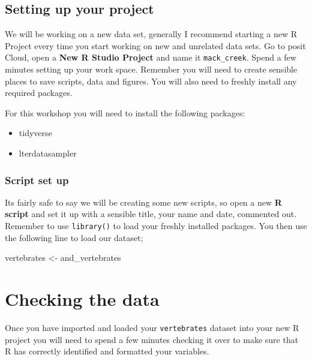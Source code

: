 \documentclass[
]{book}
\newenvironment{Shaded}{\begin{snugshade}}{\end{snugshade}}
\newcommand{\NormalTok}[1]{#1}
\newcommand{\OtherTok}[1]{\textcolor[rgb]{0.56,0.35,0.01}{#1}}
\providecommand{\tightlist}{%
  \setlength{\itemsep}{0pt}\setlength{\parskip}{0pt}}
\begin{document}
\hypertarget{setting-up-your-project}{%
\section{Setting up your project}\label{setting-up-your-project}}

We will be working on a new data set, generally I recommend starting a new R Project every time you start working on new and unrelated data sets. Go to posit Cloud, open a \textbf{New R Studio Project} and name it \texttt{mack\_creek}. Spend a few minutes setting up your work space. Remember you will need to create sensible places to save scripts, data and figures. You will also need to freshly install any required packages.

For this workshop you will need to install the following packages:

\begin{itemize}
\tightlist
\item
  tidyverse
\item
  lterdatasampler
\end{itemize}

\hypertarget{script-set-up}{%
\subsection{Script set up}\label{script-set-up}}

Its fairly safe to say we will be creating some new scripts, so open a new \textbf{R script} and set it up with a sensible title, your name and date, commented out. Remember to use \texttt{library()} to load your freshly installed packages. You then use the following line to load our dataset;

\begin{Shaded}
\begin{Highlighting}[]
\NormalTok{vertebrates }\OtherTok{\textless{}{-}}\NormalTok{ and\_vertebrates}
\end{Highlighting}
\end{Shaded}

\hypertarget{checking-the-data}{%
\chapter{Checking the data}\label{checking-the-data}}

Once you have imported and loaded your \texttt{vertebrates} dataset into your new R project you will need to spend a few minutes checking it over to make sure that R has correctly identified and formatted your variables.
\end{document}
